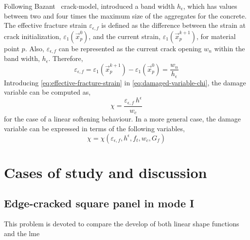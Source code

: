 \documentclass[preprint,12pt,a4paper]{elsarticle}
\begin{document}
Following Bazant~\cite{Bazant83} crack-model, \cite{Navas_2017_ES}
introduced a band width $h_{\epsilon}$, which has values between two
and four times the maximum size of the aggregates for the
concrete. The effective fracture strain $\varepsilon_{\epsilon,f}$ is
defined as the difference between the strain at crack initialization,
$\varepsilon_1(\vec{x}_p^{0})$, and the current strain, $\varepsilon_1(\vec{x}_p^{k+1})$, for material
point $p$. Also, $\varepsilon_{\epsilon,f}$ can be represented as the
current crack opening $w_n$ within the band width,
$h_{\epsilon}$. Therefore,
\begin{equation}
  \label{eq:effective-fracture-strain}
  \varepsilon_{\epsilon,f} = \varepsilon_1(\vec{x}_p^{k+1}) -
  \varepsilon_1(\vec{x}_p^{0}) = \frac{w_n}{h_{\epsilon}}
\end{equation}
Introducing \eqref{eq:effective-fracture-strain} in
\eqref{eq:damaged-variable-chi}, the damage variable can be computed
as,
\begin{equation}
  \label{eq:damage-variable-chi-II}
\chi = \frac{\varepsilon_{\epsilon,f}\ h^{\epsilon}}{w_c}  
\end{equation}
for the case of a linear softening behaviour. In a more general case,
the damage variable can be expressed in terms of the following
variables,
\begin{equation}
  \label{eq:damage-variable-chi-III}
  \chi = \chi(\varepsilon_{\epsilon,f}, h^{\epsilon}, f_t, w_c, G_f)
\end{equation}
\section{Cases of study and discussion}
\label{sec:3}

\subsection{Edge-cracked square panel in mode I}
\label{sec:edge-cracked-square-I}

This problem is devoted to compare the develop of both linear shape
functions and the \acrshort{lme}
\end{document}
